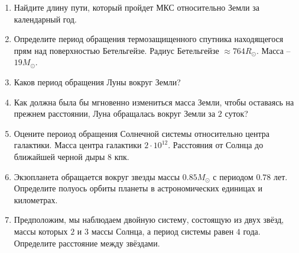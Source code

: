 \documentclass[12pt]{article}
\begin{document}
\begin{enumerate}
    \item Найдите длину пути, который пройдет МКС относительно Земли за календарный год.
    \item Определите период обращения термозащищенного спутника находящегося прям над поверхностью Бетельгейзе. Радиус Бетельгейзе $\approx 764 R_{\odot}$. Масса -- $19 M_{\odot}$. %
    \item Каков период обращения Луны вокруг Земли?
    \item Как должна была бы мгновенно измениться масса Земли, чтобы оставаясь на прежнем расстоянии, Луна обращалась вокруг Земли за $2$ суток? %
    \item Оцените пероиод обращения Солнечной системы относительно центра галактики. Масса центра галактики $2\cdot10^{12}$. Расстояния от Солнца до ближайшей черной дыры $8$ кпк. %
    \item Экзопланета обращается вокруг звезды массы $0.85 M_{\odot}$ с периодом $0.78$ лет. Определите полуось орбиты планеты в астрономических единицах и километрах. %
    \item Предположим, мы наблюдаем двойную систему, состоящую из двух звёзд, массы которых $2$ и $3$ массы Солнца, а период системы равен $4$ года. Определите расстояние между звёздами. %
\end{enumerate}
\end{document}

